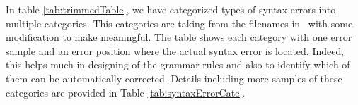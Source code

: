In table \ref{tab:trimmedTable}, we have categorized types of syntax errors into multiple categories. This categories are taking from the filenames in~\cite{TurtleTests:Online} with some modification to make meaningful. The table shows each category with one error sample and an error position where the actual syntax error is located. Indeed, this helps much in designing of the grammar rules and also to identify which of them can be automatically corrected. Details including more samples of these categories are provided in Table \ref{tab:syntaxErrorCate}.     
